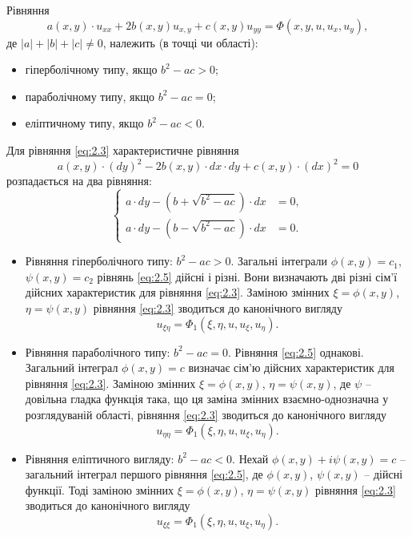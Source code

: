 Рівняння
\begin{equation}
	\label{eq:2.3}
	a(x, y) \cdot u_{x x} + 2 b(x, y) u_{x, y} + c(x, y) u_{y y} = \Phi(x, y, u, u_x, u_y),
\end{equation}
де $|a| + |b| + |c| \ne 0$, належить (в точці чи області):
\begin{itemize}
	\item гіперболічному типу, якщо $b^2 - a c > 0$;
	\item параболічному типу, якщо $b^2 - a c = 0$;
	\item еліптичному типу, якщо $b^2 - a c < 0$.
\end{itemize}

Для рівняння \ref{eq:2.3} характеристичне рівняння
\begin{equation}
	\label{eq:2.4}
	a(x, y) \cdot (dy)^2 - 2 b(x, y) \cdot dx \cdot dy + c(x, y) \cdot (dx)^2 = 0
\end{equation}
розпадається на два рівняння:
\begin{equation}
	\label{eq:2.5}
	\left\{
		\begin{aligned}
			a \cdot dy - \left( b + \sqrt{b^2 - a c} \right) \cdot dx &= 0, \\
			a \cdot dy - \left( b - \sqrt{b^2 - a c} \right) \cdot dx &= 0.
		\end{aligned}
	\right.
\end{equation}
\begin{itemize}
	\item Рівняння гіперболічного типу: $b^2 - a c > 0$. Загальні інтеграли $\phi(x, y) = c_1$, $\psi(x, y) = c_2$ рівнянь \ref{eq:2.5} дійсні і різні. Вони визначають дві різні сім'ї дійсних характеристик для рівняння \ref{eq:2.3}. Заміною змінних $\xi = \phi(x, y)$, $\eta = \psi(x, y)$ рівняння \ref{eq:2.3} зводиться до канонічного вигляду
	\begin{equation}
		u_{\xi \eta} = \Phi_1(\xi, \eta, u, u_\xi, u_\eta).
	\end{equation}
	\item Рівняння параболічного типу: $b^2 - a c = 0$. Рівняння \ref{eq:2.5} однакові. Загальний інтеграл $\phi(x, y) = c$ визначає сім'ю дійсних характеристик для рівняння \ref{eq:2.3}. Заміною змінних $\xi = \phi(x, y)$, $\eta = \psi(x, y)$, де $\psi$ -- довільна гладка функція така, що ця заміна змінних взаємно-однозначна у розглядуваній області, рівняння \ref{eq:2.3} зводиться до канонічного вигляду
	\begin{equation}
		u_{\eta \eta} = \Phi_1(\xi, \eta, u, u_\xi, u_\eta).
	\end{equation}
	\item Рівняння еліптичного вигляду: $b^2 - a c < 0$. Нехай $\phi(x, y) + i \psi(x, y) = c$ -- загальний інтеграл першого рівняння \ref{eq:2.5}, де $\phi(x, y)$, $\psi(x, y)$ -- дійсні функції. Тоді заміною змінних $\xi = \phi(x, y)$, $\eta = \psi(x, y)$ рівняння \ref{eq:2.3} зводиться до канонічного вигляду
	\begin{equation}
		u_{\xi \xi} = \Phi_1(\xi, \eta, u, u_\xi, u_\eta).
	\end{equation}
\end{itemize}
